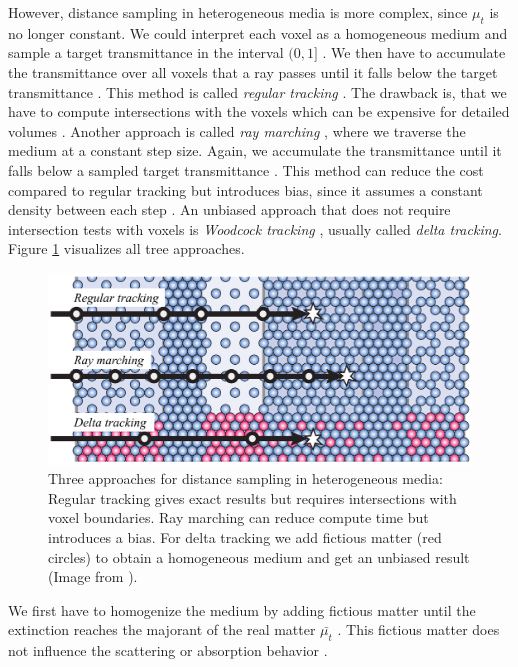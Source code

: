 However, distance sampling in heterogeneous media is more complex, since $\mu_t$ is no longer constant.
We could interpret each voxel as a homogeneous medium and sample a target transmittance in the interval $(0, 1]$ \cite{novak_overview}.
We then have to accumulate the transmittance over all voxels that a ray passes until it falls below the target transmittance \cite{novak_overview}.
This method is called \textit{regular tracking} \cite{sutton_regular_tracking}.
The drawback is, that we have to compute intersections with the voxels which can be expensive for detailed volumes \cite{novak_overview}.
Another approach is called \textit{ray marching} \cite{perlin_hypertexture}, where we traverse the medium at a constant step size.
Again, we accumulate the transmittance until it falls below a sampled target transmittance \cite{novak_overview}.
This method can reduce the cost compared to regular tracking but introduces bias, since it assumes a constant density between each step \cite{novak_overview}.
An unbiased approach that does not require intersection tests with voxels is \textit{Woodcock tracking} \cite{woodcock}, usually called \textit{delta tracking}.
Figure \ref{fig:novak_distance_sampling} visualizes all tree approaches.
\begin{figure}[ht]
    \centering
    \includegraphics[width=0.7\linewidth]{img/novak_distance_sampling.png}
    \caption[Approaches for distance sampling in heterogeneous media]{Three approaches for distance sampling in heterogeneous media: Regular tracking gives exact results but requires intersections with voxel boundaries. Ray marching can reduce compute time but introduces a bias. For delta tracking we add fictious matter (red circles) to obtain a homogeneous medium and get an unbiased result (Image from \cite{novak_overview}).}
    \label{fig:novak_distance_sampling}
\end{figure}
We first have to homogenize the medium by adding fictious matter until the extinction reaches the majorant of the real matter $\bar{\mu_t}$ \cite{novak_overview}.
This fictious matter does not influence the scattering or absorption behavior \cite{novak_overview}.
